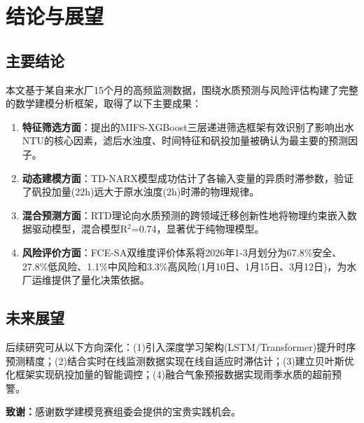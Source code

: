 \documentclass[12pt,a4paper]{ctexart}
\begin{document}
\section{结论与展望}

\subsection{主要结论}

本文基于某自来水厂15个月的高频监测数据，围绕水质预测与风险评估构建了完整的数学建模分析框架，取得了以下主要成果：

\begin{enumerate}
    \item \textbf{特征筛选方面}：提出的MIFS-XGBoost三层递进筛选框架有效识别了影响出水NTU的核心因素，滤后水浊度、时间特征和矾投加量被确认为最主要的预测因子。
    \item \textbf{动态建模方面}：TD-NARX模型成功估计了各输入变量的异质时滞参数，验证了矾投加量(22h)远大于原水浊度(2h)时滞的物理规律。
    \item \textbf{混合预测方面}：RTD理论向水质预测的跨领域迁移创新性地将物理约束嵌入数据驱动模型，混合模型R$^2$=0.74，显著优于纯物理模型。
    \item \textbf{风险评价方面}：FCE-SA双维度评价体系将2026年1-3月划分为67.8\%安全、27.8\%低风险、1.1\%中风险和3.3\%高风险(1月10日、1月15日、3月12日)，为水厂运维提供了量化决策依据。
\end{enumerate}

\subsection{未来展望}

后续研究可从以下方向深化：(1)引入深度学习架构(LSTM/Transformer)提升时序预测精度；(2)结合实时在线监测数据实现在线自适应时滞估计；(3)建立贝叶斯优化框架实现矾投加量的智能调控；(4)融合气象预报数据实现雨季水质的超前预警。

\vspace{1em}
\noindent\textbf{致谢：}感谢数学建模竞赛组委会提供的宝贵实践机会。

\newpage
\end{document}
